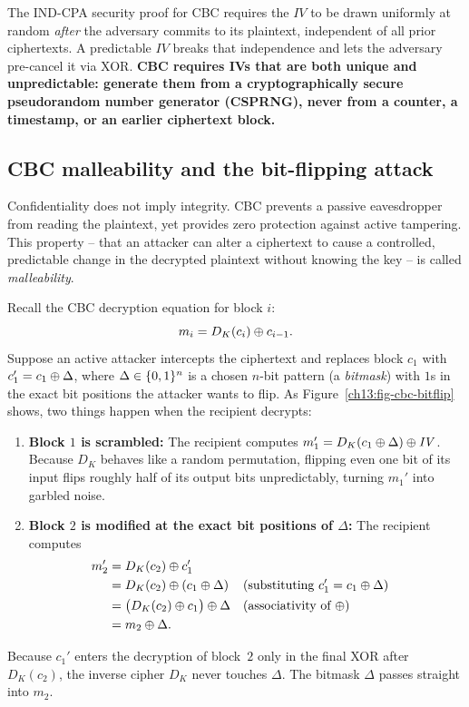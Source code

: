 \begin{whybox}
The IND-CPA security proof for CBC requires the $\mathit{IV}$ to be drawn uniformly at random \emph{after} the adversary commits to its plaintext, independent of all prior ciphertexts. A predictable $\mathit{IV}$ breaks that independence and lets the adversary pre-cancel it via XOR. \textbf{CBC requires IVs that are both unique and unpredictable: generate them from a cryptographically secure pseudorandom number generator (CSPRNG), never from a counter, a timestamp, or an earlier ciphertext block.}
\end{whybox}

\subsection{CBC malleability and the bit-flipping attack}

Confidentiality does not imply integrity. CBC prevents a passive eavesdropper from reading the plaintext, yet provides zero protection against active tampering. This property -- that an attacker can alter a ciphertext to cause a controlled, predictable change in the decrypted plaintext without knowing the key -- is called \emph{malleability}.

Recall the CBC decryption equation for block $i$:
\[
m_i = D_K(c_i) \oplus c_{i-1}.
\]
Suppose an active attacker intercepts the ciphertext and replaces block $c_1$ with $c_1' = c_1 \oplus \Delta$, where $\Delta \in \{0,1\}^n$ is a chosen $n$-bit pattern (a \emph{bitmask}) with $1$s in the exact bit positions the attacker wants to flip. As Figure~\ref{ch13:fig-cbc-bitflip} shows, two things happen when the recipient decrypts:
\begin{enumerate}
  \item \textbf{Block $1$ is scrambled:} The recipient computes $m_1' = D_K(c_1 \oplus \Delta) \oplus \mathit{IV}$. Because $D_K$ behaves like a random permutation, flipping even one bit of its input flips roughly half of its output bits unpredictably, turning $m_1'$ into garbled noise.
  \item \textbf{Block $2$ is modified at the exact bit positions of $\Delta$:} The recipient computes
  \begin{align*}
  m_2' &= D_K(c_2) \oplus c_1' \\
       &= D_K(c_2) \oplus (c_1 \oplus \Delta) && \text{(substituting $c_1' = c_1 \oplus \Delta$)} \\
       &= \big(D_K(c_2) \oplus c_1\big) \oplus \Delta && \text{(associativity of $\oplus$)} \\
       &= m_2 \oplus \Delta.
  \end{align*}
\end{enumerate}
Because $c_1'$ enters the decryption of block~$2$ only in the final XOR after $D_K(c_2)$, the inverse cipher $D_K$ never touches $\Delta$. The bitmask $\Delta$ passes straight into $m_2$.


